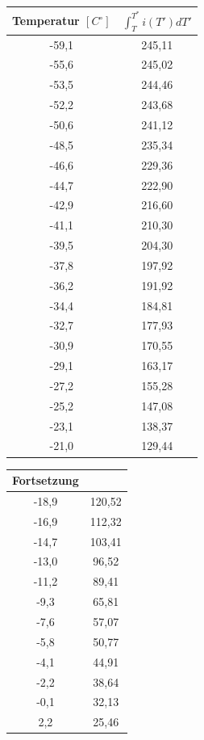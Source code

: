 \begin{table}[htbp]
\begin{minipage}[t]{0.45\textwidth}
\centering
\begin{tabular}{c|c}
Temperatur $[C^\circ]$ & $\int ^{T^*}_{T} i(T')dT'$\\\hline
-59,1 &245,11\\\hline
-55,6 &245,02\\\hline
-53,5 &244,46\\\hline
-52,2 &243,68\\\hline
-50,6 &241,12\\\hline
-48,5 &235,34\\\hline
-46,6 &229,36\\\hline
-44,7 &222,90\\\hline
-42,9 &216,60\\\hline
-41,1 &210,30\\\hline
-39,5 &204,30\\\hline
-37,8 &197,92\\\hline
-36,2 &191,92\\\hline
-34,4 &184,81\\\hline
-32,7 &177,93\\\hline
-30,9 &170,55\\\hline
-29,1 &163,17\\\hline
-27,2 &155,28\\\hline
-25,2 &147,08\\\hline
-23,1 &138,37\\\hline
-21,0 &129,44\\
\end{tabular}
\end{minipage}
\begin{minipage}[t]{0.45\textwidth}
\centering
\begin{tabular}{c|c}
Fortsetzung & \\\hline
-18,9 &120,52\\\hline
-16,9 &112,32\\\hline
-14,7 &103,41\\\hline
-13,0 &96,52\\\hline
-11,2 &89,41\\\hline
-9,3 &65,81\\\hline
-7,6 &57,07\\\hline
-5,8 &50,77\\\hline
-4,1 &44,91\\\hline
-2,2 &38,64\\\hline
-0,1 &32,13\\\hline
2,2 &25,46\\\hline

\end{tabular}
\end{minipage}
\end{table}
